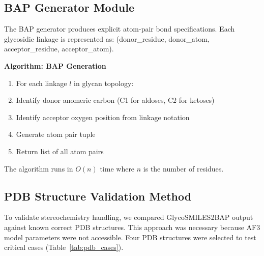 \documentclass[11pt,a4paper]{article}
\begin{document}
\subsection{BAP Generator Module}

The BAP generator produces explicit atom-pair bond specifications. Each glycosidic linkage is represented as: (donor\_residue, donor\_atom, acceptor\_residue, acceptor\_atom).

\noindent\textbf{Algorithm: BAP Generation}
\begin{enumerate}
\item For each linkage $l$ in glycan topology:
\item \quad Identify donor anomeric carbon (C1 for aldoses, C2 for ketoses)
\item \quad Identify acceptor oxygen position from linkage notation
\item \quad Generate atom pair tuple
\item Return list of all atom pairs
\end{enumerate}

\noindent The algorithm runs in $O(n)$ time where $n$ is the number of residues.

\subsection{PDB Structure Validation Method}

To validate stereochemistry handling, we compared GlycoSMILES2BAP output against known correct PDB structures. This approach was necessary because AF3 model parameters were not accessible. Four PDB structures were selected to test critical cases (Table~\ref{tab:pdb_cases}).
\end{document}
